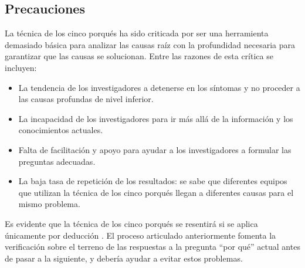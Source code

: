 \subsection{Precauciones}

La técnica de los cinco porqués ha sido criticada por ser una herramienta demasiado básica para analizar las causas raíz con la profundidad necesaria para garantizar que las causas se solucionan.
Entre las razones de esta crítica se incluyen:

\begin{itemize}
    \item La tendencia de los investigadores a detenerse en los síntomas y no proceder a las causas profundas de nivel inferior.
    \item La incapacidad de los investigadores para ir más allá de la información y los conocimientos actuales.
    \item Falta de facilitación y apoyo para ayudar a los investigadores a formular las preguntas adecuadas.
    \item La baja tasa de repetición de los resultados: se sabe que diferentes equipos que utilizan la técnica de los cinco porqués llegan a diferentes causas para el mismo problema.
\end{itemize}

Es evidente que la técnica de los cinco porqués se resentirá si se aplica únicamente por deducción \cite{serrat_five_2017}.
El proceso articulado anteriormente fomenta la verificación sobre el terreno de las respuestas a la pregunta ``por qué'' actual antes de pasar a la siguiente, y debería ayudar a evitar estos problemas.